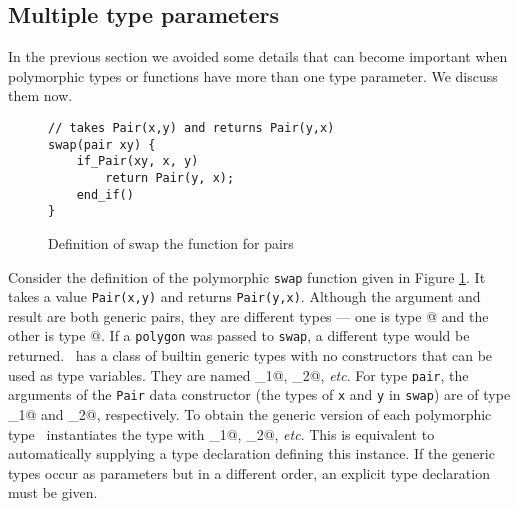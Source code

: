 \subsection{Multiple type parameters}
\label{sec-typevar}

In the previous section we avoided some details that can become
important when polymorphic types or functions have more than one type
parameter.  We discuss them now.


\begin{figure}[!ht]
\begin{verbatim}
// takes Pair(x,y) and returns Pair(y,x)
swap(pair xy) {
    if_Pair(xy, x, y)
        return Pair(y, x);
    end_if()
}
\end{verbatim}
\caption{Definition of swap the function for pairs}
\label{fig:swapdef}
\end{figure}

Consider the definition of the polymorphic \texttt{swap} function given
in Figure \ref{fig:swapdef}.  It takes a value \texttt{Pair(x,y)} and
returns \texttt{Pair(y,x)}.  Although the argument and result are both
generic pairs, they are different types --- one is type @
and the other is type @.  If a \texttt{polygon} was
passed to \texttt{swap}, a different type would be returned.  \Adtpp\
has a class of builtin generic types with no constructors that can
be used as type variables.  They are named \verb@adt_1@, \verb@adt_2@,
\emph{etc}.  For type \texttt{pair}, the arguments of the \texttt{Pair}
data constructor (the types of \texttt{x} and \texttt{y} in \texttt{swap})
are of type \verb@adt_1@ and \verb@adt_2@, respectively.  To obtain the
generic version of each polymorphic type \adtpp\ instantiates the type with
\verb@adt_1@, \verb@adt_2@, \emph{etc}.  This is equivalent to
automatically supplying a type declaration defining this instance.  If the
generic types occur as parameters but in a different order, an explicit
type declaration must be given.



